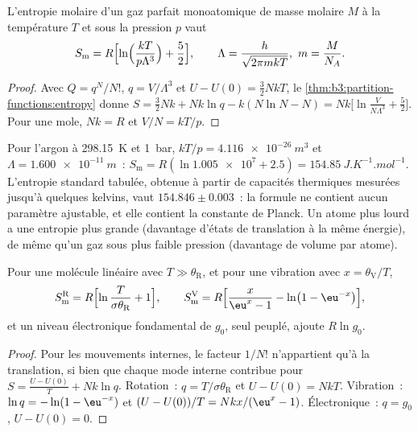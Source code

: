 \begin{theorem}\label{thm:b3:partition-functions:sackur-tetrode}
L'entropie molaire d'un gaz parfait monoatomique de masse molaire $M$ à
la température $T$
et sous la pression $p$ vaut
\[
  S_{\mathrm m} = R\Bigl[\ln\Bigl(\frac{kT}{p\Lambda^3}\Bigr) + \frac52\Bigr],
  \qquad \Lambda = \frac{h}{\sqrt{2\pi mkT}},\ m = \frac{M}{N_A}.
\]
\end{theorem}

\begin{proof}
Avec $Q = q^N/N!$, $q = V/\Lambda^3$ et $U - U(0) = \frac32NkT$,
le \cref{thm:b3:partition-functions:entropy} donne $S = \frac32Nk + Nk\ln q - k(N\ln N - N) =
Nk\bigl[\ln\frac{V}{N\Lambda^3} + \frac52\bigr]$. Pour une mole,
$Nk = R$ et $V/N = kT/p$.
\end{proof}

Pour l'argon à \qty{298.15}{K} et \qty{1}{bar}, $kT/p = \qty{4.116e-26}{m^3}$ et $\Lambda =
\qty{1.600e-11}{m}$~: $S_{\mathrm m} = R(\ln\num{1.005e7} + 2.5) = \qty{154.85}{J.K^{-1}.mol^{-1}}$.
L'entropie standard tabulée, obtenue à partir de capacités thermiques
mesurées jusqu'à quelques kelvins, vaut $154.846 \pm 0.003$~: la
formule ne contient aucun paramètre ajustable, et elle contient la
constante de Planck. Un atome plus lourd a une entropie plus grande
(davantage d'états de translation à la même énergie), de même qu'un gaz
sous plus faible pression (davantage de volume par atome).

\begin{proposition}\label{prop:b3:partition-functions:modes-entropy}
Pour une molécule linéaire avec $T \gg \theta_{\mathrm R}$, et pour une
vibration avec $x = \theta_{\mathrm V}/T$,
\[
  S^{\mathrm R}_{\mathrm m} = R\Bigl[\ln\frac{T}{\sigma\theta_{\mathrm R}} + 1\Bigr],
  \qquad
  S^{\mathrm V}_{\mathrm m} = R\Bigl[\frac{x}{\eu^x - 1} - \ln\bigl(1 - \eu^{-x}\bigr)\Bigr],
\]
et un niveau électronique fondamental de  $g_0$, seul peuplé, ajoute $R\ln g_0$.
\end{proposition}

\begin{proof}
Pour les mouvements internes, le facteur $1/N!$ n'appartient qu'à la
translation, si bien que chaque mode interne contribue pour
$S = \frac{U - U(0)}{T} + Nk\ln q$. Rotation~:
$q = T/\sigma\theta_{\mathrm R}$ et $U - U(0) = NkT$. Vibration~:
$\ln q = -\ln(1 - \eu^{-x})$ et
$(U - U(0))/T = Nkx/(\eu^x - 1)$. Électronique~: $q = g_0$, $U - U(0) = 0$.
\end{proof}

